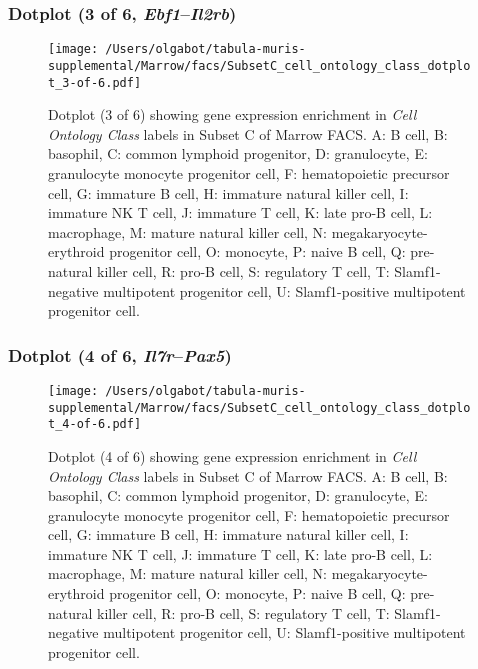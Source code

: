 \subsubsection{Dotplot (3 of 6, \emph{Ebf1}--\emph{Il2rb})}
\begin{figure}[h]
\centering
\texttt{[image: /Users/olgabot/tabula-muris-supplemental/Marrow/facs/SubsetC\_cell\_ontology\_class\_dotplot\_3-of-6.pdf]}

\caption{ Dotplot (3 of 6)  showing gene expression enrichment in \emph{Cell Ontology Class} labels in Subset C of Marrow FACS. A: B cell, B: basophil, C: common lymphoid progenitor, D: granulocyte, E: granulocyte monocyte progenitor cell, F: hematopoietic precursor cell, G: immature B cell, H: immature natural killer cell, I: immature NK T cell, J: immature T cell, K: late pro-B cell, L: macrophage, M: mature natural killer cell, N: megakaryocyte-erythroid progenitor cell, O: monocyte, P: naive B cell, Q: pre-natural killer cell, R: pro-B cell, S: regulatory T cell, T: Slamf1-negative multipotent progenitor cell, U: Slamf1-positive multipotent progenitor cell.}
\end{figure}


\clearpage

\subsubsection{Dotplot (4 of 6, \emph{Il7r}--\emph{Pax5})}
\begin{figure}[h]
\centering
\texttt{[image: /Users/olgabot/tabula-muris-supplemental/Marrow/facs/SubsetC\_cell\_ontology\_class\_dotplot\_4-of-6.pdf]}

\caption{ Dotplot (4 of 6)  showing gene expression enrichment in \emph{Cell Ontology Class} labels in Subset C of Marrow FACS. A: B cell, B: basophil, C: common lymphoid progenitor, D: granulocyte, E: granulocyte monocyte progenitor cell, F: hematopoietic precursor cell, G: immature B cell, H: immature natural killer cell, I: immature NK T cell, J: immature T cell, K: late pro-B cell, L: macrophage, M: mature natural killer cell, N: megakaryocyte-erythroid progenitor cell, O: monocyte, P: naive B cell, Q: pre-natural killer cell, R: pro-B cell, S: regulatory T cell, T: Slamf1-negative multipotent progenitor cell, U: Slamf1-positive multipotent progenitor cell.}
\end{figure}


\clearpage


